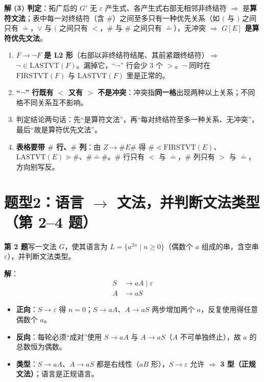 \documentclass[12pt,a4paper,fontset=windows]{ctexart}
\newcommand{\FV}[1]{\ensuremath{\mathrm{FIRSTVT}(#1)}}
\newcommand{\LV}[1]{\ensuremath{\mathrm{LASTVT}(#1)}}
\newcommand{\imp}{\ensuremath{\Rightarrow}}
\begin{document}
\textbf{解 (3) 判定}：拓广后的 $G'$ 无 $\varepsilon$ 产生式、各产生式右部无相邻非终结符 \imp{} 是\textbf{算符文法}；表中每一对终结符（含 $\#$）之间至多只有一种优先关系（如 $($ 与 $)$ 之间只有 $\doteq$，$\vee$ 与 $($ 之间只有 $<$，$\#$ 与 $\#$ 之间只有 $\doteq$），无冲突 \imp{} \textbf{$G[E]$ 是算符优先文法}。

\begin{warnbox}
\begin{enumerate}
\item \textbf{$F \to \neg F$ 是 L2 形}（右部以非终结符结尾、其前紧跟终结符）\imp{} $\neg \in \LV{F}$。漏掉它，``$\neg$'' 行会少 3 个 $>$。$\neg$ 同时在 \FV{F} 与 \LV{F} 里是正常的。
\item \textbf{``$\neg$'' 行既有 $<$ 又有 $>$ 不是冲突}：冲突指\textbf{同一格}出现两种以上关系；不同格不同关系互不影响。
\item 判定结论两句话：先``是算符文法''，再``每对终结符至多一种关系、无冲突''，最后``故是算符优先文法''。
\item \textbf{表格要带 $\#$ 行、$\#$ 列}：由 $Z \to \#E\#$ 得 $\# \lessdot \FV{E}$、$\LV{E} \gtrdot \#$、$\# \doteq \#$。$\#$ 行只有 $<$ 与 $\doteq$，$\#$ 列只有 $>$ 与 $\doteq$，方向别写反。
\end{enumerate}
\end{warnbox}

\section{\texorpdfstring{题型2：语言 $\to$ 文法，并判断文法类型（第 2--4 题）}{题型2：语言→文法，并判断文法类型（第 2–4 题）}}

\begin{qbox}
{\large\bfseries 第 2 题}\quad 写一文法 $G$，使其语言为 $L=\{a^{2n} \mid n \ge 0\}$（偶数个 $a$ 组成的串，含空串 $\varepsilon$），并判断文法类型。
\end{qbox}

\textbf{解}：
\[
\begin{aligned}
S &\to aA \mid \varepsilon\\
A &\to aS
\end{aligned}
\]
\begin{itemize}
\item \textbf{正向}：$S \to \varepsilon$ 得 $n=0$；$S \to aA$、$A \to aS$ 两步增加两个 $a$，反复使用得任意偶数个 $a$。
\item \textbf{反向}：每轮必须``成对''使用 $S \to aA$ 与 $A \to aS$（$A$ 不可单独终止），故 $a$ 的总数恒为偶数。
\item \textbf{类型}：$S \to aA$、$A \to aS$ 都是右线性（$aB$ 形），$S \to \varepsilon$ 允许 \imp{} \textbf{3 型（正规文法）}；语言是正规语言。
\end{itemize}
\end{document}
